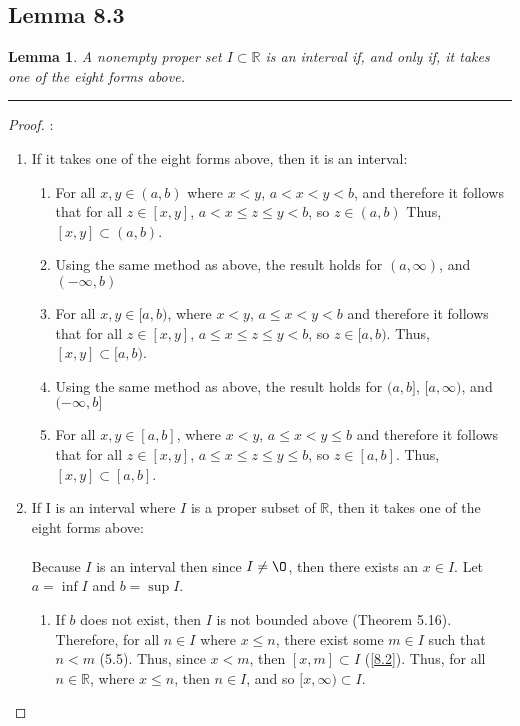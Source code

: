 \documentclass[openany, amssymb, psamsfonts]{amsart}
\newcommand{\bbR}{\mathbb{R}}
\renewcommand{\emptyset}{\O}
\newtheorem{lem}{Lemma}[section]
\theoremstyle{definition}
\numberwithin{equation}{section}
\begin{document}
\subsection*{Lemma 8.3}
\begin{lem}
A nonempty proper set $I\subset \bbR$ is an {\em interval} if, and only if, it takes one of the eight forms above.
\end{lem}
\vspace{4pt}     \hrule   \vspace{4pt}
\begin{proof}:\\
\begin{enumerate}
\item If it takes one of the eight forms above, then it is an interval:
\begin{enumerate}
\item For all $x,y\in (a,b)$ where $x<y$, $a<x<y<b$, and therefore it follows that for all $z\in [x,y]$, $a<x\leq z \leq y<b$, so $z\in (a,b)$ Thus, $[x,y] \subset (a,b)$.
\item Using the same method as above, the result holds for $(a,\infty)$, and $(-\infty, b)$
\item For all $x,y \in [a,b)$, where $x<y$, $a\leq x <y <b$ and therefore it follows that for all $z\in [x,y]$, $a\leq x\leq z \leq y<b$, so $z\in [a,b)$. Thus, $[x,y] \subset [a,b)$.
\item Using the same method as above, the result holds for $(a,b]$, $[a,\infty)$, and $(-\infty, b]$
\item For all $x,y \in [a,b]$, where $x<y$, $a\leq x <y \leq b$ and therefore it follows that for all $z\in [x,y]$, $a\leq x\leq z \leq y\leq b$, so $z\in [a,b]$. Thus, $[x,y] \subset [a,b]$. 
\end{enumerate}
\item If I is an interval where $I$ is a proper subset of $\bbR$, then it takes one of the eight forms above:\\\\Because $I$ is an interval then since $I \neq \emptyset$, then there exists an $x\in I$. Let $a = \inf I$ and $b = \sup I$.
\begin{enumerate}
\item If $b$ does not exist, then $I$ is not bounded above (Theorem 5.16). Therefore, for all $n\in I$ where $x\leq n$, there exist some $m\in I$ such that $n<m$ (5.5). Thus, since $x<m$, then $[x,m]\subset I$ (\ref{8.2}). Thus, for all $n\in \bbR$, where $x\leq n$, then $n\in I$, and so $[x,\infty)\subset  I$.

\end{enumerate}
\end{enumerate}
\end{proof}
\end{document}
